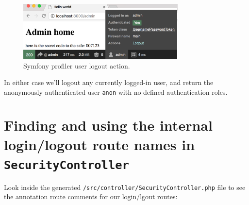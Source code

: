 \documentclass[a4paperpaper,openright]{book}
\newenvironment{Shaded}{}{}
\newcommand{\AnnotationTok}[1]{\textcolor[rgb]{0.38,0.63,0.69}{\textbf{\textit{#1}}}}
\newcommand{\CommentTok}[1]{\textcolor[rgb]{0.38,0.63,0.69}{\textit{#1}}}
\newcommand{\KeywordTok}[1]{\textcolor[rgb]{0.00,0.44,0.13}{\textbf{#1}}}
\newcommand{\NormalTok}[1]{#1}
\newcommand{\OtherTok}[1]{\textcolor[rgb]{0.00,0.44,0.13}{#1}}
\newcommand{\StringTok}[1]{\textcolor[rgb]{0.25,0.44,0.63}{#1}}
\begin{document}
\begin{figure}
\centering
\includegraphics[width=0.75\textwidth,height=\textheight]{./tex2pdf.-40a8cafc9587c9a0/e0059108995273ffa1150aad93ab2af90f546186.png}
\caption{Symfony profiler user logout action. \label{logout_link}}
\end{figure}

In either case we'll logout any currently logged-in user, and return the
anonymously authenticated user \texttt{anon} with no defined
authentication roles.

\hypertarget{finding-and-using-the-internal-loginlogout-route-names-in-securitycontroller}{%
\section{\texorpdfstring{Finding and using the internal login/logout
route names in
\texttt{SecurityController}}{Finding and using the internal login/logout route names in SecurityController}}\label{finding-and-using-the-internal-loginlogout-route-names-in-securitycontroller}}

Look inside the generated
\texttt{/src/controller/SecurityController.php} file to see the
annotation route comments for our login/lgout routes:

\begin{Shaded}
\end{Shaded}
\end{document}
